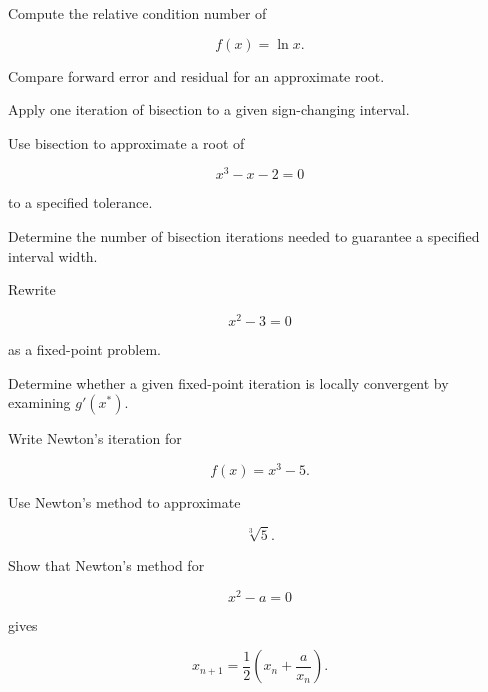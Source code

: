 \begin{exercise}[3]
Compute the relative condition number of

\[
f(x)=\ln x.
\]
\end{exercise}

\begin{exercise}[3]
Compare forward error and residual for an approximate root.
\end{exercise}

\begin{exercise}[2]
Apply one iteration of bisection to a given sign-changing interval.
\end{exercise}

\begin{exercise}[3]
Use bisection to approximate a root of

\[
x^3-x-2=0
\]

to a specified tolerance.
\end{exercise}

\begin{exercise}[3]
Determine the number of bisection iterations needed to guarantee a
specified interval width.
\end{exercise}

\begin{exercise}[2]
Rewrite

\[
x^2-3=0
\]

as a fixed-point problem.
\end{exercise}

\begin{exercise}[3]
Determine whether a given fixed-point iteration is locally convergent by
examining \(g'(x^*)\).
\end{exercise}

\begin{exercise}[2]
Write Newton's iteration for

\[
f(x)=x^3-5.
\]
\end{exercise}

\begin{exercise}[3]
Use Newton's method to approximate

\[
\sqrt[3]{5}.
\]
\end{exercise}

\begin{exercise}[3]
Show that Newton's method for

\[
x^2-a=0
\]

gives

\[
x_{n+1}
=
\frac12
\left(
x_n+\frac{a}{x_n}
\right).
\]
\end{exercise}

